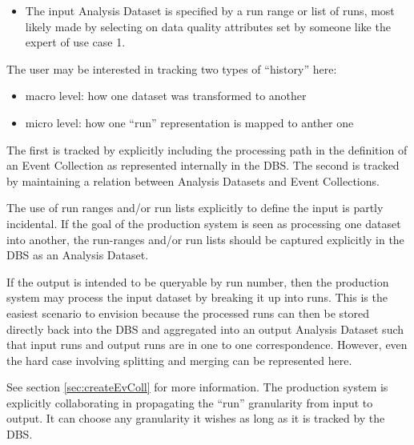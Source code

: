 \documentclass{cmspaper}
\begin{document}

\begin{itemize}
\item The input Analysis Dataset is specified by a run range or list
     of runs, most likely made by selecting on data quality attributes set by
     someone like the expert of use case 1.  
\end{itemize}

The user may be interested in tracking two types of ``history'' here:
\begin{itemize}
      \item macro level: how one dataset was transformed to another
      \item micro level: how one ``run'' representation is mapped to anther one
\end{itemize}
The first is tracked by explicitly including the processing path in the
definition of an Event Collection as represented internally in the DBS.  
The second is tracked by maintaining a relation between Analysis Datasets
and Event Collections.

The use of run ranges and/or run lists explicitly to define the input is 
partly incidental. If the goal of the production system is seen as
processing one dataset into another, the run-ranges and/or run lists 
should be captured explicitly in the DBS as an Analysis Dataset. 

If the output is intended to be queryable by run number, then the
production system may process the input dataset by breaking it up into
runs.  This is the easiest scenario to envision because the processed
runs can then be stored directly back into the DBS and aggregated into an
output Analysis Dataset such that input runs and output runs are in one
to one correspondence.  However, even the hard case involving splitting
and merging can be represented here.

See section \ref{sec:createEvColl} for more information. 
The production system is explicitly collaborating in propagating the
``run'' granularity from input to output.  It can choose any granularity it 
wishes as long as it is tracked by the DBS.  
\end{document}
